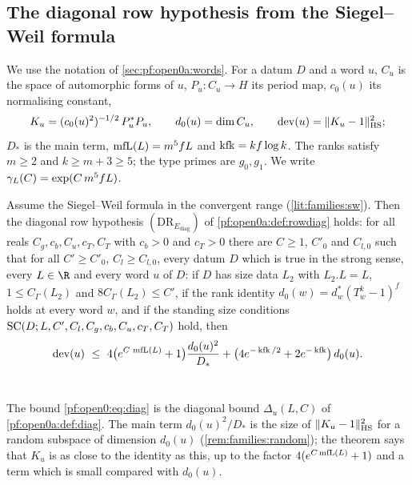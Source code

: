 \subsection{The diagonal row hypothesis from the Siegel--Weil formula}\label{sec:pf:open0:diag}

We use the notation of \cref{sec:pf:open0a:words}. For a datum $D$ and a word $u$, $C_u$ is the space of automorphic forms
of $u$, $P_u\colon C_u\to H$ its period map, $c_0(u)$ its normalising constant,
\[
K_u=(c_0(u)^2)^{-1/2}\,P_u^*P_u,\qquad d_0(u)=\dim C_u,\qquad \operatorname{dev}(u)=\|K_u-1\|_{\mathrm{HS}}^2 ;
\]
$D_*$ is the main term, $\operatorname{mfL}(L)=m^5fL$ and $\operatorname{kfk}=kf\log k$. The ranks satisfy $m\ge2$ and $k\ge m+3\ge5$; the
type primes are $g_0,g_1$. We write $\gamma_L(C)=\exp(C\,m^5fL)$.

\begin{theorem}\label{pf:open0:diagthm}
Assume the Siegel--Weil formula in the convergent range (\cref{lit:families:sw}). Then the diagonal row hypothesis
$(\mathrm{DR}_{E_{\mathrm{diag}}})$ of \cref{pf:open0a:def:rowdiag} holds: for all reals $C_g,c_b,C_u,c_T,C_T$ with $c_b>0$
and $c_T>0$ there are $C\ge1$, $C'_0$ and $C_{l,0}$ such that for all $C'\ge C'_0$, $C_l\ge C_{l,0}$, every datum $D$
which is true in the strong sense, every $L\in\R$ and every word $u$ of $D$: if $D$ has size data $L_2$ with $L_2.L=L$,
$1\le C_\Gamma(L_2)$ and $8C_\Gamma(L_2)\le C'$, if the rank identity $d_0(w)=d_w^*(T_w^k-1)^f$ holds at every word $w$, and
if the standing size conditions $\mathrm{SC}(D;L,C',C_l,C_g,c_b,C_u,c_T,C_T)$ hold, then
\begin{equation}\label{pf:open0:eq:diag}
\openzerodev(u)\ \le\ 4\bigl(e^{C\,\openzeromfL(L)}+1\bigr)\frac{d_0(u)^2}{D_*}
+\bigl(4e^{-\openzerokfk/2}+2e^{-\openzerokfk}\bigr)\,d_0(u).
\end{equation}
\
\end{theorem}

The bound \eqref{pf:open0:eq:diag} is the diagonal bound $\Delta_u(L,C)$ of \cref{pf:open0a:def:diag}. The main term $d_0(u)^2/D_*$
is the size of $\|K_u-1\|_{\mathrm{HS}}^2$ for a random subspace of dimension $d_0(u)$ (\cref{rem:families:random}); the theorem
says that $K_u$ is as close to the identity as this, up to the factor $4(e^{C\operatorname{mfL}(L)}+1)$ and a term which is small
compared with $d_0(u)$.

